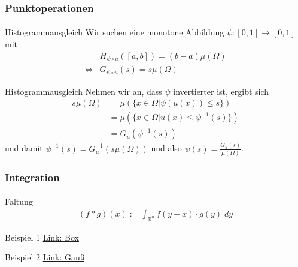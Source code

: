 \documentclass{beamer}
\begin{document}
\begin{frame}
    \frametitle{Punktoperationen}
\framesubtitle{}

    \begin{block}{Histogrammausgleich}
Wir suchen eine  monotone Abbildung $\psi :[0,1] \to [0,1]$ mit
 \begin{align*}
&H_{\psi \circ u} ([a,b]) =  (b-a)\mu(\Omega) \\
\Leftrightarrow & G_{\psi \circ u} (s) = s \mu(\Omega)
\end{align*}
\end{block}

    \begin{block}{Histogrammausgleich}
Nehmen wir an, dass $\psi$ invertierter ist, ergibt sich
 \begin{align*}
 s \mu(\Omega) & =  \mu ( \{  x \in \Omega | \psi( u(x)) \leq  s \} ) \\
 & =  \mu ( \{  x \in \Omega |  u(x) \leq  \psi^{-1} (s )\} ) \\
& = G_{u}(\psi^{-1} (s ))
\end{align*}
und damit $\psi^{-1} (s ) = G_u^{-1} (s \mu(\Omega))$ und also
$\psi(s) = \frac{G_u(s)}{\mu(\Omega)}$.
\end{block}



 \end{frame}




\begin{frame}
    \frametitle{Integration}
\framesubtitle{}

    \begin{block}{Faltung}
\begin{align}
(f * g )(x) := \int_{\mathbb{R}^n}  f(y-x) \cdot g(y) \; dy 
\end{align}

\end{block}
    \begin{block}{Beispiel 1}
\href{https://moodle.dhbw-mannheim.de/pluginfile.php/278535/mod_folder/content/0/Convolution_of_box_signal_with_itself.gif?forcedownload=1}{Link: Box}
\end{block}
 
    \begin{block}{Beispiel 2}
\href{https://moodle.dhbw-mannheim.de/pluginfile.php/278535/mod_folder/content/0/Convolution_Animation_(Gaussian).gif?forcedownload=1}{Link: Gauß}
\end{block}
 
\end{frame}
\end{document}
